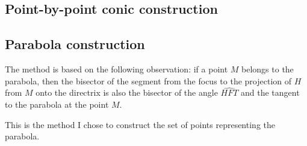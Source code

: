 \subsection{Point-by-point conic construction} %
\label{sub:point_by_point_conic_construction}




\subsection{Parabola construction} %
\label{sub:parabola_construction}


The method is based on the following observation: if a point $M$ belongs to the parabola, then the bisector of the segment from the focus to the projection of $H$ from $M$ onto the directrix is also the bisector of the angle $\widehat{HFT}$ and the tangent to the parabola at the point $M$.

This is the method I chose to construct the set of points representing the parabola.
\vspace{6pt}

